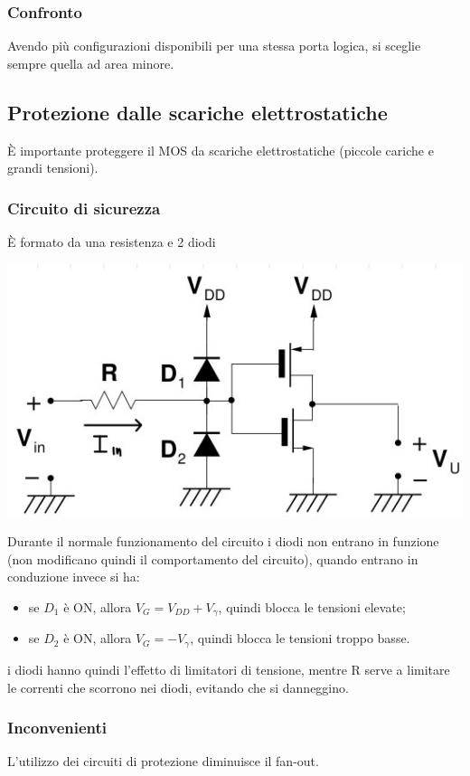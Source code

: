 \documentclass[11pt,a4paper,]{article}
\begin{document}
\subsubsection{Confronto}
Avendo più configurazioni disponibili per una stessa porta logica, si sceglie sempre quella ad area minore.

\subsection{Protezione dalle scariche elettrostatiche}
È importante proteggere il MOS da scariche elettrostatiche (piccole cariche e grandi tensioni).
\subsubsection{Circuito di sicurezza}
È formato da una resistenza e 2 diodi
\begin{center}
	\includegraphics[width=0.4\linewidth]{"img/circ sicu"}
\end{center}
Durante il normale funzionamento del circuito i diodi non entrano in funzione (non modificano quindi il comportamento del circuito), quando entrano in conduzione invece si ha:
\begin{itemize}
	\item se $D_1$ è ON, allora $V_G = V_{DD} + V_{\gamma}$, quindi blocca le tensioni elevate;
	\item se $D_2$ è ON, allora $V_G = -V_{\gamma}$, quindi blocca le tensioni troppo basse.
\end{itemize}
i diodi hanno quindi l'effetto di limitatori di tensione, mentre R serve a limitare le correnti che scorrono nei diodi, evitando che si danneggino.
\subsubsection{Inconvenienti}
L'utilizzo dei circuiti di protezione diminuisce il fan-out.
\end{document}

